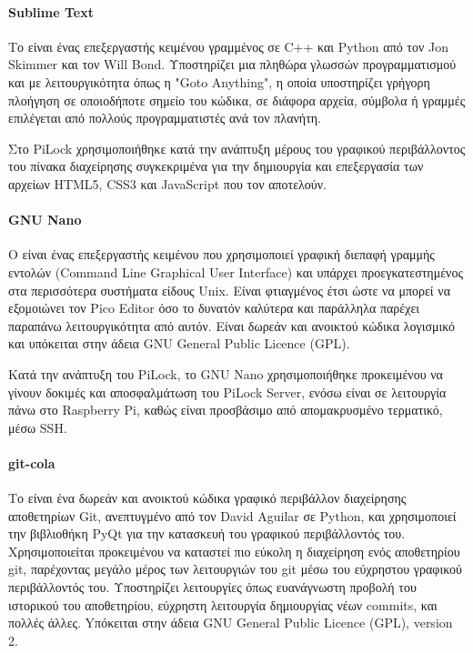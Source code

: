  			\paragraph{Sublime Text}
 				Το  είναι ένας επεξεργαστής κειμένου γραμμένος σε C++ και Python από τον Jon Skimmer και τον Will Bond. Υποστηρίζει μια πληθώρα γλωσσών προγραμματισμού και με λειτουργικότητα όπως η "Goto Anything", η οποία υποστηρίζει γρήγορη πλοήγηση σε οποιοδήποτε σημείο του κώδικα, σε διάφορα αρχεία, σύμβολα ή γραμμές επιλέγεται από πολλούς προγραμματιστές ανά τον πλανήτη.

 				Στο PiLock χρησιμοποιήθηκε κατά την ανάπτυξη μέρους του γραφικού περιβάλλοντος του πίνακα διαχείρησης συγκεκριμένα για την δημιουργία και επεξεργασία των αρχείων HTML5, CSS3 και JavaScript που τον αποτελούν.

 			\paragraph{GNU Nano}
 				Ο  είναι ένας επεξεργαστής κειμένου που χρησιμοποιεί γραφική διεπαφή γραμμής εντολών (Command Line Graphical User Interface) και υπάρχει προεγκατεστημένος στα περισσότερα συστήματα είδους Unix. Είναι φτιαγμένος έτσι ώστε να μπορεί να εξομοιώνει τον Pico Editor όσο το δυνατόν καλύτερα και παράλληλα παρέχει παραπάνω λειτουργικότητα από αυτόν. Είναι δωρεάν και ανοικτού κώδικα λογισμικό και υπόκειται στην άδεια GNU General Public Licence (GPL).

 				Κατά την ανάπτυξη του PiLock, το GNU Nano χρησιμοποιήθηκε προκειμένου να γίνουν δοκιμές και αποσφαλμάτωση του PiLock Server, ενόσω είναι σε λειτουργία πάνω στο Raspberry Pi, καθώς είναι προσβάσιμο από απομακρυσμένο τερματικό, μέσω SSH.

 			\paragraph{git-cola}
 				Το  είναι ένα δωρεάν και ανοικτού κώδικα γραφικό περιβάλλον διαχείρησης αποθετηρίων Git, ανεπτυγμένο από τον David Aguilar σε Python, και χρησιμοποιεί την βιβλιοθήκη PyQt για την κατασκευή του γραφικού περιβάλλοντός του. Χρησιμοποιείται προκειμένου να καταστεί πιο εύκολη η διαχείρηση ενός αποθετηρίου git, παρέχοντας μεγάλο μέρος των λειτουργιών του git μέσω του εύχρηστου γραφικού περιβάλλοντός του. Υποστηρίζει λειτουργίες όπως ευανάγνωστη προβολή του ιστορικού του αποθετηρίου, εύχρηστη λειτουργία δημιουργίας νέων commits, και πολλές άλλες. Yπόκειται στην άδεια GNU General Public Licence (GPL), version 2.